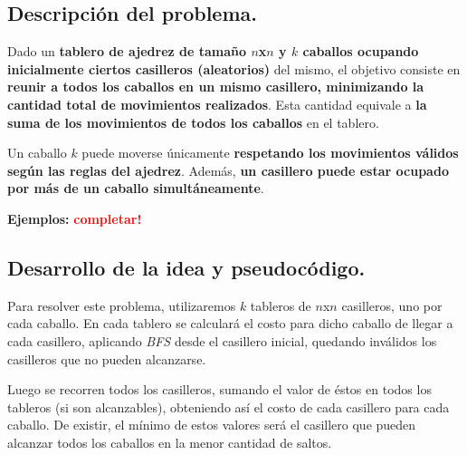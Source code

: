 \subsection{Descripción del problema.}

\vspace*{0.3cm}

Dado un \textbf{tablero de ajedrez de tamaño $n$x$n$ y $k$ caballos ocupando
inicialmente ciertos casilleros (aleatorios)} del mismo, el objetivo consiste
en \textbf{reunir a todos los caballos en un mismo casillero, minimizando la
cantidad total de movimientos realizados}. Esta cantidad equivale a
\textbf{la suma de los movimientos de todos los caballos} en el tablero.

Un caballo $k$ puede moverse únicamente \textbf{respetando los movimientos
válidos según las reglas del ajedrez}. Además, \textbf{un casillero puede
estar ocupado por más de un caballo simultáneamente}.

\vspace*{0.5cm}

\textbf{Ejemplos:}
  \textcolor{red}{\textbf{completar!}}



\newpage
\subsection{Desarrollo de la idea y pseudocódigo.}

\vspace*{0.3cm}


Para resolver este problema, utilizaremos $k$ tableros de $n$x$n$ casilleros,
uno por cada caballo. En cada tablero se calculará el costo para dicho caballo
de llegar a cada casillero, aplicando \textit{BFS} desde el casillero inicial,
quedando inválidos los casilleros que no pueden alcanzarse.

Luego se recorren todos los casilleros, sumando el valor de éstos en todos los
tableros (si son alcanzables), obteniendo así el costo de cada casillero para
cada caballo. De existir, el mínimo de estos valores será el casillero que
pueden alcanzar todos los caballos en la menor cantidad de saltos.

